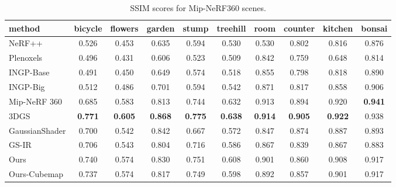 \documentclass{article} %
\begin{document}
\begin{table}[ht]
    \small
    \centering
    \renewcommand{\arraystretch}{1}
    \caption{SSIM scores for Mip-NeRF360 scenes.}
    \label{tab:mip2}
    \begin{tabular}{l|ccccc|cccc}
         \hline 
         method & bicycle & flowers & garden & stump & treehill & room & counter & kitchen & bonsai\\
        \hline NeRF++ & 0.526 & 0.453 & 0.635  &  0.594 & 0.530 &  0.530 &0.802 &0.816 &0.876 \\
         Plenoxels & 0.496 &  0.431 &  0.606 & 0.523 & 0.509  & 0.842 &0.759 &0.648 &0.814 \\
         INGP-Base & 0.491 & 0.450 & 0.649 & 0.574 &   0.518 &  0.855 &0.798 &0.818 & 0.890 \\
         INGP-Big & 0.512 & 0.486 &   0.701 & 0.594 &  0.542&  0.871 &0.817 & 0.858 &0.906\\
         Mip-NeRF 360 & 0.685 & \cellcolor{b}0.583 &  0.813 & 0.744 &  \cellcolor{b}0.632 &  \cellcolor{b}0.913 &\cellcolor{b}0.894 &\cellcolor{b}0.920 &\cellcolor{a}\textbf{0.941} \\
         3DGS & \cellcolor{a}\textbf{0.771} &  \cellcolor{a}\textbf{0.605} &  \cellcolor{a}\textbf{0.868} & \cellcolor{a}\textbf{ 0.775} &  \cellcolor{a} \textbf{0.638} & \cellcolor{a} \textbf{0.914} &\cellcolor{a}\textbf{0.905} & \cellcolor{a} \textbf{0.922} & \cellcolor{b}0.938\\
        \hline GaussianShader & 0.700 & 0.542 &\cellcolor{b}0.842 &  0.667 & 0.572 & 0.847 & \cellcolor{c}0.874 & 0.887 & 0.893\\
         GS-IR & 0.706 & 0.543 & 0.804 & 0.716 & 0.586 & 0.867 & 0.839 &  0.867 &  0.883\\
         \hline
         Ours  & \cellcolor{b}0.740 & \cellcolor{c}0.574 & \cellcolor{c}0.830 & \cellcolor{b}0.751 & \cellcolor{c} 0.608 & \cellcolor{c}0.901 & 0.860 & \cellcolor{c}0.908 & \cellcolor{c}0.917\\
         Ours-Cubemap &\cellcolor{c}0.737 & \cellcolor{c}0.574 & 0.817 & \cellcolor{c} 0.749 &  0.598&  0.892 &  0.857 & 0.901 &\cellcolor{c}0.917\\
        \hline 
    \end{tabular}
\end{table}
\end{document}
